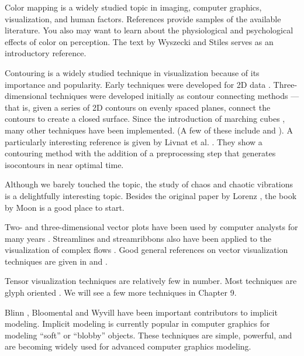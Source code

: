 Color mapping is a widely studied topic in imaging, computer graphics, visualization, and human factors. References \cite{Durrett87} \cite{Ware88} \cite{Rheingans92} provide samples of the available literature. You also may want to learn about the physiological and psychological effects of color on perception. The text by Wyszecki and Stiles \cite{Wyszecki82} serves as an introductory reference.

Contouring is a widely studied technique in visualization because of its importance and popularity. Early techniques were developed for 2D data \cite{Watson92}. Three-dimensional techniques were developed initially as contour connecting methods \cite{Fuchs77} --- that is, given a series of 2D contours on evenly spaced planes, connect the contours to create a closed surface. Since the introduction of marching cubes \cite{Lorensen87}, many other techniques have been implemented. (A few of these include \cite{Nielson91} \cite{Montani94} and \cite{Durst88} ). A particularly interesting reference is given by Livnat et al. \cite{Livnat96}. They show a contouring method with the addition of a preprocessing step that generates isocontours in near optimal time.

Although we barely touched the topic, the study of chaos and chaotic vibrations is a delightfully interesting topic. Besides the original paper by Lorenz \cite{Lorenz63}, the book by Moon \cite{Moon87} is a good place to start.

Two- and three-dimensional vector plots have been used by computer analysts for many years \cite{Fuller80}. Streamlines and streamribbons also have been applied to the visualization of complex flows \cite{Volpe89}. Good general references on vector visualization techniques are given in \cite{Helman90} and \cite{Richter90}.

Tensor visualization techniques are relatively few in number. Most techniques are glyph oriented \cite{Haber90} \cite{deLeeuw93}. We will see a few more techniques in Chapter 9.

Blinn \cite{Blinn82}, Bloomental \cite{Bloomenthal88} \cite{Bloomenthal97} and Wyvill \cite{Wyvill86} have been important contributors to implicit modeling. Implicit modeling is currently popular in computer graphics for modeling ``soft'' or ``blobby'' objects. These techniques are simple, powerful, and are becoming widely used for advanced computer graphics modeling.

\printbibliography


